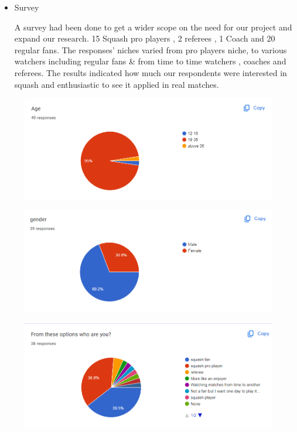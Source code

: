 \documentclass[12pt]{article}
\begin{document}
\begin{itemize}
    \item Survey 
    
    
    A survey had been done to get a wider scope on the need for our project and expand our research. 15 Squash pro players , 2  referees , 1 Coach and 20 regular fans.
    The responses' niches varied from pro players niche, to various watchers including regular fans \& from time to time watchers , coaches and referees. 
    The results indicated how much our respondents were interested in squash and  enthusiastic to see it applied in real matches.
    \end{itemize}
    
    \begin{figure}[H]
    \centering
    \includegraphics[width=0.7\linewidth]{figures/age.png}
    \label{fig:Question 1}
    \end{figure}
    
    \begin{figure}[H]
    \centering
    \includegraphics[width=0.7\linewidth]{figures/gender.png}
    \label{fig:Question 2}
    \end{figure}
    
    \begin{figure}[H]
    \centering
    \includegraphics[width=0.7\linewidth]{figures/who are you.png}
    \label{fig:Question 3}
    \end{figure}
    
\end{document}
